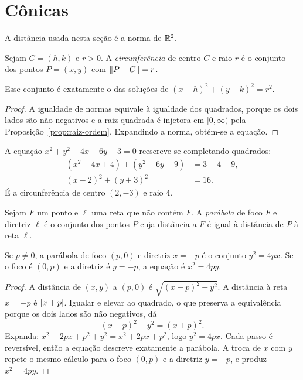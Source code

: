 \documentclass[11pt,a4paper]{article}
\begin{document}
\section{Cônicas}

A distância usada nesta seção é a norma de $\mathbb{R}^2$.

\begin{definicao}
Sejam $C=(h,k)$ e $r>0$. A \emph{circunferência} de centro $C$ e raio $r$ é o conjunto dos pontos $P=(x,y)$ com $\left\lVert P-C \right\rVert=r$.
\end{definicao}

\begin{proposicao}
Esse conjunto é exatamente o das soluções de $(x-h)^2+(y-k)^2=r^2$.
\end{proposicao}

\begin{proof}
A igualdade de normas equivale à igualdade dos quadrados, porque os dois lados são não negativos e a raiz quadrada é injetora em $[0,\infty)$ pela Proposição~\ref{prop:raiz-ordem}. Expandindo a norma, obtém-se a equação.
\end{proof}

\begin{exemplo}
A equação $x^2+y^2-4x+6y-3=0$ reescreve-se completando quadrados:
\begin{align*}
(x^2-4x+4)+(y^2+6y+9)&=3+4+9,\\
(x-2)^2+(y+3)^2&=16.
\end{align*}
É a circunferência de centro $(2,-3)$ e raio $4$.
\end{exemplo}

\begin{definicao}
Sejam $F$ um ponto e $\ell$ uma reta que não contém $F$. A \emph{parábola} de foco $F$ e diretriz $\ell$ é o conjunto dos pontos $P$ cuja distância a $F$ é igual à distância de $P$ à reta $\ell$.
\end{definicao}

\begin{teorema}\label{teo:parabola}
Se $p\neq 0$, a parábola de foco $(p,0)$ e diretriz $x=-p$ é o conjunto $y^2=4px$. Se o foco é $(0,p)$ e a diretriz é $y=-p$, a equação é $x^2=4py$.
\end{teorema}

\begin{proof}
A distância de $(x,y)$ a $(p,0)$ é $\sqrt{(x-p)^2+y^2}$. A distância à reta $x=-p$ é $\left\lvert x+p \right\rvert$. Igualar e elevar ao quadrado, o que preserva a equivalência porque os dois lados são não negativos, dá
\[
(x-p)^2+y^2=(x+p)^2.
\]
Expanda: $x^2-2px+p^2+y^2=x^2+2px+p^2$, logo $y^2=4px$. Cada passo é reversível, então a equação descreve exatamente a parábola. A troca de $x$ com $y$ repete o mesmo cálculo para o foco $(0,p)$ e a diretriz $y=-p$, e produz $x^2=4py$.
\end{proof}
\end{document}
